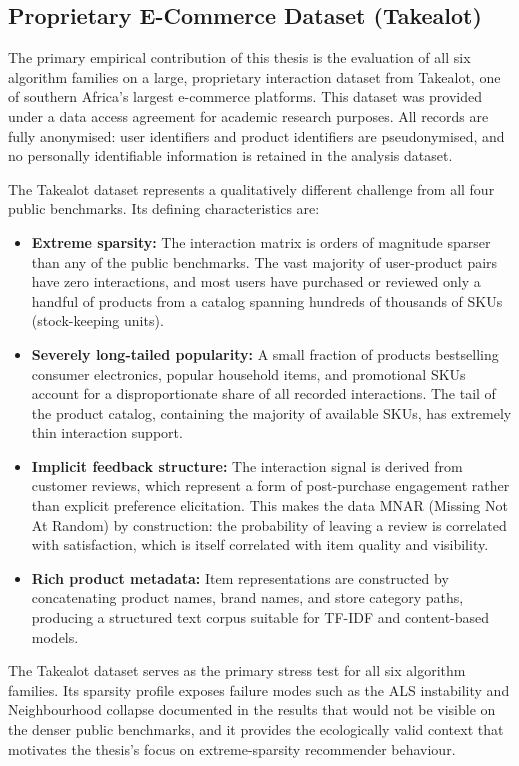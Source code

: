 \documentclass[11pt,a4paper]{report}
\begin{document}
\subsection*{Proprietary E-Commerce Dataset (Takealot)}

The primary empirical contribution of this thesis is the evaluation of all six algorithm families on a large, proprietary interaction dataset from Takealot, one of southern Africa's largest e-commerce platforms. This dataset was provided under a data access agreement for academic research purposes. All records are fully anonymised: user identifiers and product identifiers are pseudonymised, and no personally identifiable information is retained in the analysis dataset.

The Takealot dataset represents a qualitatively different challenge from all four public benchmarks. Its defining characteristics are:

\begin{itemize}
    \item \textbf{Extreme sparsity:} The interaction matrix is orders of magnitude sparser than any of the public benchmarks. The vast majority of user-product pairs have zero interactions, and most users have purchased or reviewed only a handful of products from a catalog spanning hundreds of thousands of SKUs (stock-keeping units).
    \item \textbf{Severely long-tailed popularity:} A small fraction of products bestselling consumer electronics, popular household items, and promotional SKUs account for a disproportionate share of all recorded interactions. The tail of the product catalog, containing the majority of available SKUs, has extremely thin interaction support.
    \item \textbf{Implicit feedback structure:} The interaction signal is derived from customer reviews, which represent a form of post-purchase engagement rather than explicit preference elicitation. This makes the data MNAR (Missing Not At Random) by construction: the probability of leaving a review is correlated with satisfaction, which is itself correlated with item quality and visibility.
    \item \textbf{Rich product metadata:} Item representations are constructed by concatenating product names, brand names, and store category paths, producing a structured text corpus suitable for TF-IDF and content-based models.
\end{itemize}

The Takealot dataset serves as the primary stress test for all six algorithm families. Its sparsity profile exposes failure modes such as the ALS instability and Neighbourhood collapse documented in the results that would not be visible on the denser public benchmarks, and it provides the ecologically valid context that motivates the thesis's focus on extreme-sparsity recommender behaviour.
\end{document}
